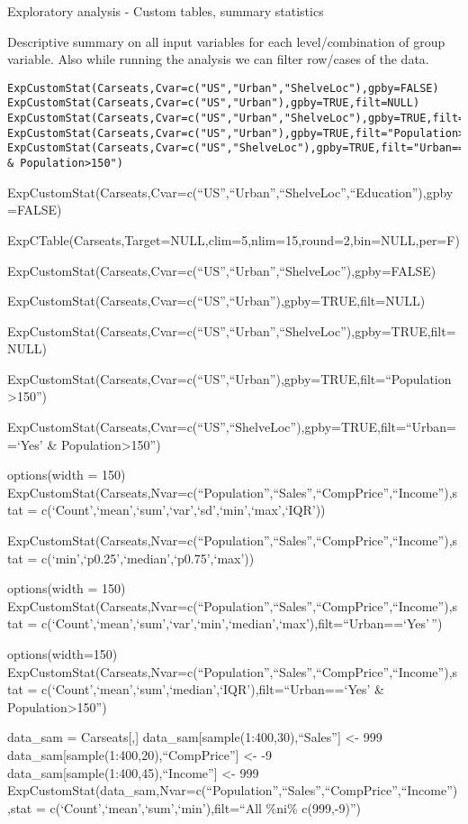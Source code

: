 \documentclass[]{article}
\begin{document}
Exploratory analysis - Custom tables, summary statistics

Descriptive summary on all input variables for each level/combination of
group variable. Also while running the analysis we can filter row/cases
of the data.

\begin{verbatim}
ExpCustomStat(Carseats,Cvar=c("US","Urban","ShelveLoc"),gpby=FALSE)
ExpCustomStat(Carseats,Cvar=c("US","Urban"),gpby=TRUE,filt=NULL)
ExpCustomStat(Carseats,Cvar=c("US","Urban","ShelveLoc"),gpby=TRUE,filt=NULL)
ExpCustomStat(Carseats,Cvar=c("US","Urban"),gpby=TRUE,filt="Population>150")
ExpCustomStat(Carseats,Cvar=c("US","ShelveLoc"),gpby=TRUE,filt="Urban=='Yes' & Population>150")
\end{verbatim}

ExpCustomStat(Carseats,Cvar=c(``US'',``Urban'',``ShelveLoc'',``Education''),gpby=FALSE)

ExpCTable(Carseats,Target=NULL,clim=5,nlim=15,round=2,bin=NULL,per=F)

ExpCustomStat(Carseats,Cvar=c(``US'',``Urban'',``ShelveLoc''),gpby=FALSE)

ExpCustomStat(Carseats,Cvar=c(``US'',``Urban''),gpby=TRUE,filt=NULL)

ExpCustomStat(Carseats,Cvar=c(``US'',``Urban'',``ShelveLoc''),gpby=TRUE,filt=NULL)

ExpCustomStat(Carseats,Cvar=c(``US'',``Urban''),gpby=TRUE,filt=``Population\textgreater150'')

ExpCustomStat(Carseats,Cvar=c(``US'',``ShelveLoc''),gpby=TRUE,filt=``Urban==`Yes'
\& Population\textgreater150'')

options(width = 150)
ExpCustomStat(Carseats,Nvar=c(``Population'',``Sales'',``CompPrice'',``Income''),stat
= c(`Count',`mean',`sum',`var',`sd',`min',`max',`IQR'))

ExpCustomStat(Carseats,Nvar=c(``Population'',``Sales'',``CompPrice'',``Income''),stat
= c(`min',`p0.25',`median',`p0.75',`max'))

options(width = 150)
ExpCustomStat(Carseats,Nvar=c(``Population'',``Sales'',``CompPrice'',``Income''),stat
=
c(`Count',`mean',`sum',`var',`min',`median',`max'),filt=``Urban==`Yes'\,'')

options(width=150)
ExpCustomStat(Carseats,Nvar=c(``Population'',``Sales'',``CompPrice'',``Income''),stat
= c(`Count',`mean',`sum',`median',`IQR'),filt=``Urban==`Yes' \&
Population\textgreater150'')

data\_sam = Carseats{[},{]} data\_sam{[}sample(1:400,30),``Sales''{]}
\textless- 999 data\_sam{[}sample(1:400,20),``CompPrice''{]} \textless-
-9 data\_sam{[}sample(1:400,45),``Income''{]} \textless- 999
ExpCustomStat(data\_sam,Nvar=c(``Population'',``Sales'',``CompPrice'',``Income''),stat
= c(`Count',`mean',`sum',`min'),filt=``All \%ni\% c(999,-9)'')
\end{document}
